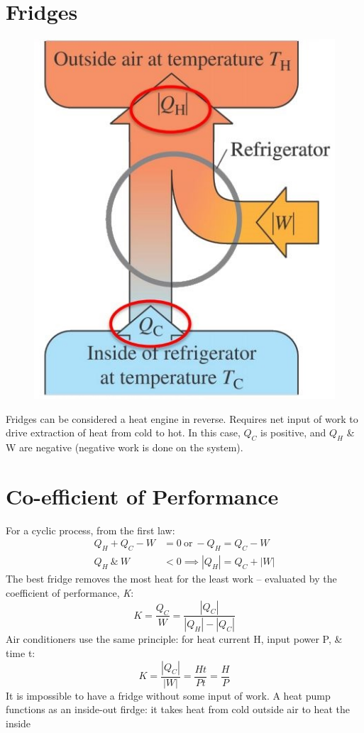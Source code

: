 \documentclass[a4paper, 11pt, normalem]{report}
\begin{document}
\section{Fridges}
\begin{figure}
    \centering
    \includegraphics[scale=0.7]{Fridge.jpg} 
\end{figure}
Fridges can be considered a heat engine in reverse.
Requires net input of work to drive extraction of heat from cold to hot.
In this case, $Q_{C}$ is positive, and $Q_{H}$ \& W are negative (negative work is done on the system).

\section{Co-efficient of Performance}
For a cyclic process, from the first law:
\begin{align}
    Q_{H} + Q_{C} - W &= 0 ~\text{or}~ -Q_{H} = Q_{C} - W \\
    Q_{H} ~\&~ W &< 0 \implies |Q_{H}| = Q_{C} + |W|
\end{align}
The best fridge removes the most heat for the least work -- evaluated by the coefficient of performance, \emph{K}:
\begin{equation}
	K = \frac{Q_{C}}{W} = \frac{|Q_{C}|}{|Q_{H}| - |Q_{C}|}
\end{equation}
Air conditioners use the same principle: for heat current H, input power P, \& time t:
\begin{equation}
	K = \frac{|Q_{C}|}{|W|} = \frac{Ht}{Pt} = \frac{H}{P}
\end{equation}
It is impossible to have a fridge without some input of work.
A heat pump functions as an inside-out firdge: it takes heat from cold outside air to heat the inside
\end{document}
